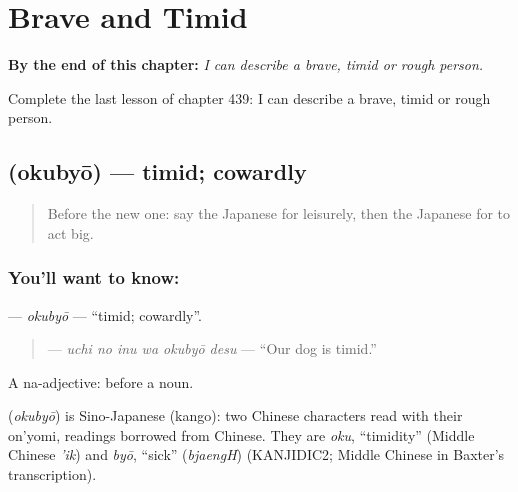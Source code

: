 
\chapter{Brave and Timid}
\label{ch:ja-brave-and-timid}

\begin{chapteropening}
\textbf{By the end of this chapter:} \emph{I can describe a brave, timid or rough person.}

Complete the last lesson of chapter 439: I can describe a brave, timid or rough person.
\end{chapteropening}

\section[\texorpdfstring{\ja{おくびょう} (okubyō)}{おくびょう (okubyō)}]{ (okubyō) — timid; cowardly}

\label{lesson:JA-C439-okubyou}



\begin{quote}
Before the new one: say the Japanese for leisurely, then the Japanese for to act big.
\end{quote}

\subsection*{You'll want to know: }
\textbf{} — \emph{okubyō} — \textquotedblleft{}timid; cowardly\textquotedblright{}.

\begin{quote}
\textbf{  } — \emph{uchi no inu wa okubyō desu} — \textquotedblleft{}Our dog is timid.\textquotedblright{}
\end{quote}

A na-adjective:  before a noun.

\begin{cousinweb}
\textbf{} (\emph{okubyō}) is Sino-Japanese (kango): two Chinese characters read with their on'yomi, readings borrowed from Chinese. They are \emph{oku}, \textquotedblleft{}timidity\textquotedblright{} (Middle Chinese \emph{'ik}) and \emph{byō}, \textquotedblleft{}sick\textquotedblright{} (\emph{bjaengH}) (KANJIDIC2; Middle Chinese in Baxter's transcription).
\end{cousinweb}


